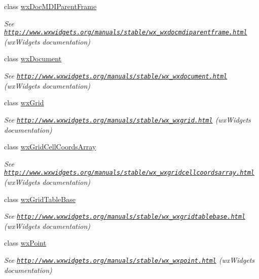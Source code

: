 \begin{DoxyCompactItemize}
class \hyperlink{classwxDocMDIParentFrame}{wxDocMDIParentFrame}
\begin{DoxyCompactList}\small\item\em See \href{http://www.wxwidgets.org/manuals/stable/wx_wxdocmdiparentframe.html}{\tt http://www.wxwidgets.org/manuals/stable/wx\_\-wxdocmdiparentframe.html} (wxWidgets documentation) \item\end{DoxyCompactList}\item 
class \hyperlink{classwxDocument}{wxDocument}
\begin{DoxyCompactList}\small\item\em See \href{http://www.wxwidgets.org/manuals/stable/wx_wxdocument.html}{\tt http://www.wxwidgets.org/manuals/stable/wx\_\-wxdocument.html} (wxWidgets documentation) \item\end{DoxyCompactList}\item 
class \hyperlink{classwxGrid}{wxGrid}
\begin{DoxyCompactList}\small\item\em See \href{http://www.wxwidgets.org/manuals/stable/wx_wxgrid.html}{\tt http://www.wxwidgets.org/manuals/stable/wx\_\-wxgrid.html} (wxWidgets documentation) \item\end{DoxyCompactList}\item 
class \hyperlink{classwxGridCellCoordsArray}{wxGridCellCoordsArray}
\begin{DoxyCompactList}\small\item\em See \href{http://www.wxwidgets.org/manuals/stable/wx_wxgridcellcoordsarray.html}{\tt http://www.wxwidgets.org/manuals/stable/wx\_\-wxgridcellcoordsarray.html} (wxWidgets documentation) \item\end{DoxyCompactList}\item 
class \hyperlink{classwxGridTableBase}{wxGridTableBase}
\begin{DoxyCompactList}\small\item\em See \href{http://www.wxwidgets.org/manuals/stable/wx_wxgridtablebase.html}{\tt http://www.wxwidgets.org/manuals/stable/wx\_\-wxgridtablebase.html} (wxWidgets documentation) \item\end{DoxyCompactList}\item 
class \hyperlink{classwxPoint}{wxPoint}
\begin{DoxyCompactList}\small\item\em See \href{http://www.wxwidgets.org/manuals/stable/wx_wxpoint.html}{\tt http://www.wxwidgets.org/manuals/stable/wx\_\-wxpoint.html} (wxWidgets documentation) \item\end{DoxyCompactList}\item 

\end{DoxyCompactItemize}
